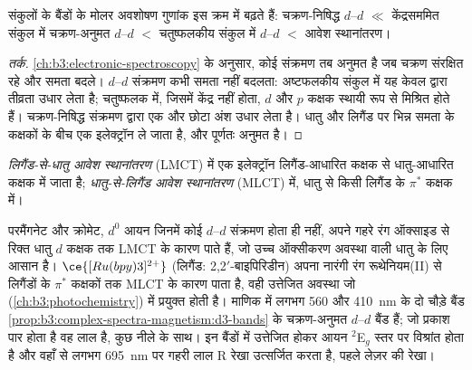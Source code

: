 \begin{proposition}[अवशोषण बैंडों की तीव्रताएँ]\label{prop:b3:complex-spectra-magnetism:intensity-order}
संकुलों के बैंडों के मोलर अवशोषण गुणांक इस क्रम में
बढ़ते हैं: चक्रण-निषिद्ध $d$--$d$ $\ll$ केंद्रसममित संकुल में चक्रण-अनुमत $d$--$d$ $<$ चतुष्फलकीय संकुल में $d$--$d$
$<$ आवेश स्थानांतरण।
\end{proposition}

\begin{proof}[तर्क]
\cref{ch:b3:electronic-spectroscopy} के अनुसार, कोई संक्रमण तब अनुमत है जब चक्रण
संरक्षित रहे और समता बदले। $d$--$d$ संक्रमण कभी समता नहीं बदलता:
अष्टफलकीय संकुल में यह केवल  द्वारा तीव्रता उधार लेता है;
चतुष्फलक में, जिसमें केंद्र नहीं होता, $d$ और $p$ कक्षक स्थायी रूप से मिश्रित होते हैं।
चक्रण-निषिद्ध संक्रमण  द्वारा एक और छोटा अंश उधार लेता है।
 धातु और लिगैंड पर भिन्न समता के कक्षकों के बीच
एक इलेक्ट्रॉन ले जाता है, और पूर्णतः अनुमत है।
\end{proof}

\begin{definition}[आवेश स्थानांतरण]\label{def:b3:complex-spectra-magnetism:ct}
\emph{लिगैंड-से-धातु आवेश स्थानांतरण}
(LMCT) में एक इलेक्ट्रॉन लिगैंड-आधारित कक्षक से धातु-आधारित
कक्षक में जाता है; \emph{धातु-से-लिगैंड आवेश स्थानांतरण}
(MLCT) में, धातु से किसी लिगैंड के $\pi^*$ कक्षक में।
\end{definition}

परमैंगनेट और क्रोमेट, $d^0$ आयन जिनमें कोई $d$--$d$ संक्रमण होता ही नहीं, अपने गहरे
रंग ऑक्साइड से रिक्त धातु $d$ कक्षक तक LMCT के कारण पाते हैं, जो उच्च
ऑक्सीकरण अवस्था वाली धातु के लिए आसान है। $\ce{[Ru(bpy)3]^{2+}}$ (लिगैंड: 2,2$'$-बाइपिरिडीन) अपना नारंगी रंग
रूथेनियम(II) से लिगैंडों के $\pi^*$ कक्षकों तक MLCT के कारण पाता है, वही उत्तेजित अवस्था जो
 (\cref{ch:b3:photochemistry}) में प्रयुक्त होती है। माणिक में
लगभग 560 और \qty{410}{nm} के दो चौड़े बैंड
\cref{prop:b3:complex-spectra-magnetism:d3-bands} के चक्रण-अनुमत $d$--$d$ बैंड हैं; जो प्रकाश पार होता है वह लाल है,
कुछ नीले के साथ। इन बैंडों में उत्तेजित होकर आयन $^2$E$_g$ स्तर पर विश्रांत होता है और
वहाँ से लगभग \qty{695}{nm} पर गहरी लाल R रेखा उत्सर्जित करता है, पहले लेज़र की रेखा।


